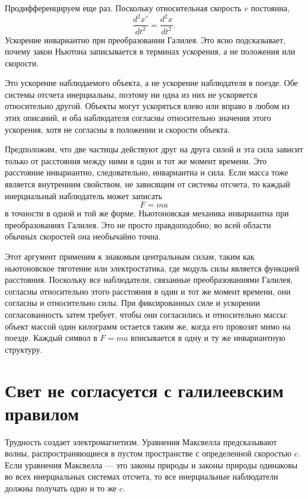Продифференцируем еще раз. Поскольку относительная скорость \(v\) постоянна,
\begin{equation}
\frac{d^2x'}{dt^2}=\frac{d^2x}{dt^2}.
\end{equation}
Ускорение инвариантно при преобразовании Галилея. Это ясно подсказывает, почему закон Ньютона записывается в терминах ускорения, а не положения или скорости.

Это ускорение наблюдаемого объекта, а не ускорение наблюдателя в поезде. Обе системы отсчета инерциальны, поэтому ни одна из них не ускоряется относительно другой. Объекты могут ускоряться влево или вправо в любом из этих описаний, и оба наблюдателя согласны относительно значения этого ускорения, хотя не согласны в положении и скорости объекта.

Предположим, что две частицы действуют друг на друга силой и эта сила зависит только от расстояния между ними в один и тот же момент времени. Это расстояние инвариантно, следовательно, инвариантна и сила. Если масса тоже является внутренним свойством, не зависящим от системы отсчета, то каждый инерциальный наблюдатель может записать
\begin{equation}
F=ma
\end{equation}
в точности в одной и той же форме. Ньютоновская механика инвариантна при преобразованиях Галилея. Это не просто правдоподобно; во всей области обычных скоростей она необычайно точна.

Этот аргумент применим к знакомым центральным силам, таким как ньютоновское тяготение или электростатика, где модуль силы является функцией расстояния. Поскольку все наблюдатели, связанные преобразованиями Галилея, согласны относительно этого расстояния в один и тот же момент времени, они согласны и относительно силы. При фиксированных силе и ускорении согласованность затем требует, чтобы они согласились и относительно массы: объект массой один килограмм остается таким же, когда его провозят мимо на поезде. Каждый символ в \(F=ma\) вписывается в одну и ту же инвариантную структуру.

\section{Свет не согласуется с галилеевским правилом}

Трудность создает электромагнетизм. Уравнения Максвелла предсказывают волны, распространяющиеся в пустом пространстве с определенной скоростью \(c\). Если уравнения Максвелла — это законы природы и законы природы одинаковы во всех инерциальных системах отсчета, то все инерциальные наблюдатели должны получать одно и то же \(c\).

